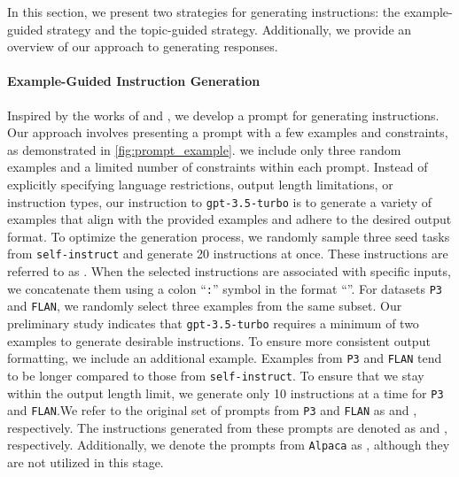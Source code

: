 \documentclass[11pt]{article}
\newcommand{\dataset}[1]{\texttt{#1}\xspace}
\newcommand{\llm}[1]{\texttt{#1}\xspace}
\newcommand{\chatgpt}{\llm{gpt-3.5-turbo}}
\begin{document}
In this section, we present two strategies for generating instructions: the example-guided strategy and the topic-guided strategy. Additionally, we provide an overview of our approach to generating responses.



\paragraph{Example-Guided Instruction Generation}
Inspired by the works of \citet{DBLP:journals/corr/abs-2212-10560} and \citet{alpaca}, we develop a prompt for generating instructions. Our approach involves presenting a prompt with a few examples and constraints, as demonstrated in \autoref{fig:prompt_example}. 
we include only three random examples and a limited number of constraints within each prompt. Instead of explicitly specifying language restrictions, output length limitations, or instruction types, our instruction to \chatgpt is to generate a variety of examples that align with the provided examples and adhere to the desired output format.
To optimize the generation process, we randomly sample three seed tasks from \dataset{self-instruct} and generate 20 instructions at once. These instructions are referred to as . When the selected instructions are associated with specific inputs, we concatenate them using a colon ``\texttt{:}'' symbol in the format ``\texttt{}''.
For datasets \dataset{P3} and \dataset{FLAN}, we randomly select three examples from the same subset. Our preliminary study indicates that \chatgpt requires a minimum of two examples to generate desirable instructions. To ensure more consistent output formatting, we include an additional example.
Examples from \dataset{P3} and \dataset{FLAN} tend to be longer compared to those from \dataset{self-instruct}. To ensure that we stay within the output length limit, we generate only 10 instructions at a time for \dataset{P3} and \dataset{FLAN}.We refer to the original set of prompts from \dataset{P3} and \dataset{FLAN} as  and , respectively. The instructions generated from these prompts are denoted as  and , respectively. Additionally, we denote the prompts from \dataset{Alpaca} as , although they are not utilized in this stage.
\end{document}
